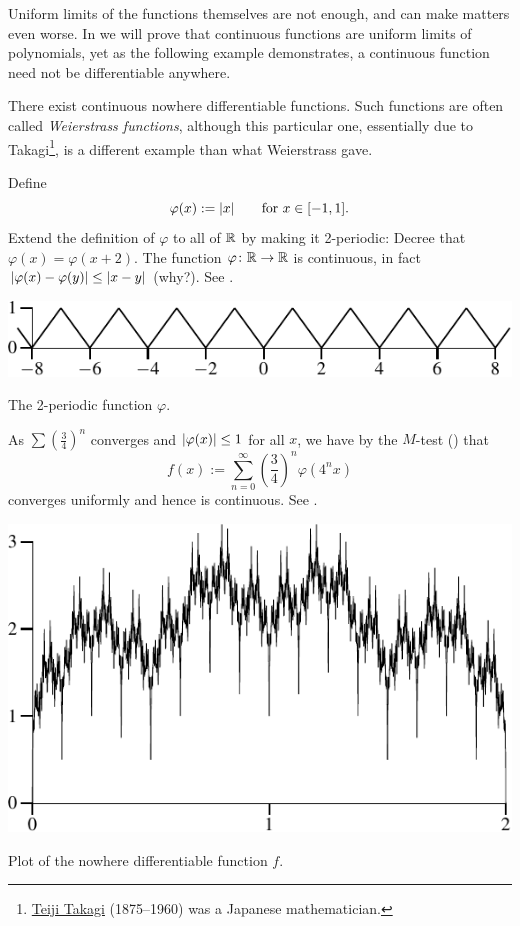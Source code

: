 Uniform limits of the functions themselves are not enough, and can make
matters even worse.  In  we will prove that
continuous functions are uniform limits of polynomials, yet as the following
example demonstrates, a continuous function need not be differentiable
anywhere.

\begin{example}
There exist continuous nowhere differentiable functions.
Such functions are often called
\emph{Weierstrass functions},
although this
particular one, essentially due to
Takagi\footnote{\href{https://en.wikipedia.org/wiki/Teiji_Takagi}{Teiji
Takagi} (1875--1960) was a Japanese mathematician.}, is a different example than what Weierstrass gave.

Define
\begin{equation*}
\varphi(x) :=\lvert {x} \rvert \qquad \text{for } x \in [-1,1] .
\end{equation*}
Extend the definition of $\varphi$ to all of ${\mathbb{R}}$ by making it
2-periodic:
Decree that
$\varphi(x) = \varphi(x+2)$.  The function $\varphi \colon {\mathbb{R}} \to {\mathbb{R}}$
is continuous, in fact $\lvert {\varphi(x)-\varphi(y)} \rvert \leq \lvert {x-y} \rvert$ (why?).
See .
\begin{myfigureht}
\includegraphics{figures/triangwave}
\caption{The 2-periodic function $\varphi$.\label{fig:triangwave}}
\end{myfigureht}

As $\sum {\left(\frac{3}{4}\right)}^n$ converges and $\lvert {\varphi(x)} \rvert \leq
1$ for all $x$, we have by the $M$-test
() that
\begin{equation*}
f(x) := \sum_{n=0}^\infty 
{\left(\frac{3}{4}\right)}^n \varphi(4^n x)
\end{equation*}
converges uniformly and hence is continuous.
See .

\begin{myfigureht}
\includegraphics{figures/nowherediff}
\caption{Plot of the nowhere differentiable function $f$.\label{fig:nowherediff}}
\end{myfigureht}


\end{example}
